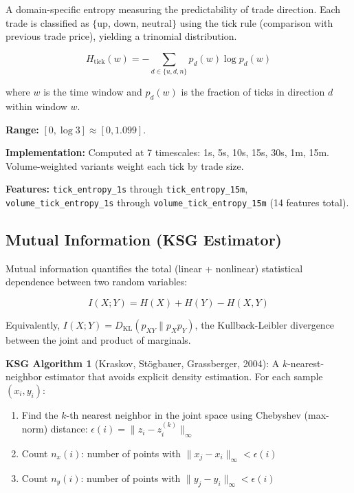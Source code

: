 \documentclass[11pt,a4paper]{article}
\begin{document}
A domain-specific entropy measuring the predictability of trade direction. Each trade is classified as $\{$up, down, neutral$\}$ using the tick rule (comparison with previous trade price), yielding a trinomial distribution.

\begin{equation}
H_{\text{tick}}(w) = -\sum_{d \in \{u, d, n\}} p_d(w) \log p_d(w)
\end{equation}

where $w$ is the time window and $p_d(w)$ is the fraction of ticks in direction $d$ within window $w$.

\textbf{Range:} $[0, \log 3] \approx [0, 1.099]$.

\textbf{Implementation:} Computed at 7 timescales: 1s, 5s, 10s, 15s, 30s, 1m, 15m. Volume-weighted variants weight each tick by trade size.

\textbf{Features:} \texttt{tick\_entropy\_1s} through \texttt{tick\_entropy\_15m}, \texttt{volume\_tick\_entropy\_1s} through \texttt{volume\_tick\_entropy\_15m} (14 features total).

\subsection{Mutual Information (KSG Estimator)}

Mutual information quantifies the total (linear + nonlinear) statistical dependence between two random variables:

\begin{equation}
I(X; Y) = H(X) + H(Y) - H(X, Y)
\end{equation}

Equivalently, $I(X; Y) = D_{\text{KL}}(p_{XY} \| p_X p_Y)$, the Kullback-Leibler divergence between the joint and product of marginals.

\textbf{KSG Algorithm 1} (Kraskov, St\"ogbauer, Grassberger, 2004): A $k$-nearest-neighbor estimator that avoids explicit density estimation. For each sample $(x_i, y_i)$:

\begin{enumerate}
    \item Find the $k$-th nearest neighbor in the joint space using Chebyshev (max-norm) distance: $\epsilon(i) = \|z_i - z_i^{(k)}\|_\infty$
    \item Count $n_x(i)$: number of points with $\|x_j - x_i\|_\infty < \epsilon(i)$
    \item Count $n_y(i)$: number of points with $\|y_j - y_i\|_\infty < \epsilon(i)$
\end{enumerate}
\end{document}
